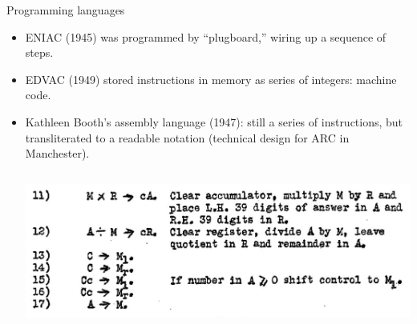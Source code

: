 \documentclass[aspectratio=169]{beamer}
\begin{document}
\begin{frame}{Programming languages}
\vspace{0.35 cm}
\begin{itemize}\setlength{\itemsep}{0.35 cm}
\item<1-> ENIAC (1945) was programmed by ``plugboard,'' wiring up a sequence of steps.

\item<2-> EDVAC (1949) stored instructions in memory as series of integers: machine code.

\item<3-> Kathleen Booth's assembly language (1947): still a series of instructions, but transliterated to a readable notation (technical design for ARC in Manchester).

\vspace{0.1 cm}
\begin{columns}
\includegraphics[width=\linewidth]{PLOTS/contracted-notation-kathleen-booth.png}


\end{columns}
\end{itemize}
\end{frame}
\end{document}
